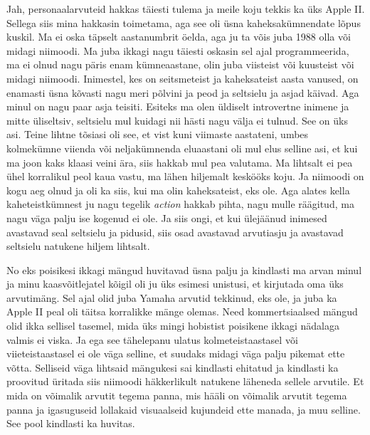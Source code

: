 
Jah, personaalarvuteid hakkas täiesti tulema ja meile koju tekkis ka üks Apple 
II. Sellega siis mina hakkasin toimetama, aga see oli 
üsna  kaheksakümnendate lõpus kuskil. Ma ei oska täpselt aastanumbrit öelda, 
aga ju ta võis juba 1988 olla või midagi niimoodi. Ma juba ikkagi  
nagu täiesti oskasin sel ajal programmeerida, ma ei olnud nagu päris enam kümneaastane, olin juba viisteist või kuusteist või midagi niimoodi. Inimestel, 
kes on seitsmeteist ja kaheksateist aasta vanused, on enamasti üsna 
kõvasti nagu meri põlvini  ja peod ja seltsielu ja asjad käivad. Aga minul on 
nagu paar asja teisiti. Esiteks ma olen üldiselt introvertne inimene ja mitte 
üliseltsiv, seltsielu mul kuidagi nii hästi nagu välja ei tulnud. See on 
üks asi. Teine lihtne tõsiasi oli see, et vist kuni viimaste aastateni, umbes 
kolmekümne viienda või neljakümnenda eluaastani oli mul elus selline asi, et kui ma 
joon kaks klaasi veini ära, siis hakkab mul pea valutama. Ma lihtsalt ei pea 
ühel  korralikul peol kaua vastu, ma lähen hiljemalt 
keskööks koju. Ja niimoodi on  kogu aeg olnud ja oli ka siis, kui ma olin 
kaheksateist, eks ole. Aga alates kella kaheteistkümnest ju nagu tegelik 
\emph{action} hakkab pihta, nagu mulle räägitud, ma nagu väga palju ise kogenud 
ei ole. Ja siis ongi, et kui  ülejäänud inimesed avastavad seal seltsielu 
ja pidusid, siis osad avastavad arvutiasju ja avastavad 
seltsielu natukene hiljem lihtsalt.


No eks poisikesi ikkagi mängud huvitavad üsna palju ja kindlasti ma arvan  
minul ja minu kaasvõitlejatel  kõigil oli ju üks esimesi unistusi, et 
kirjutada oma üks arvutimäng. Sel ajal olid juba  
Yamaha arvutid  tekkinud, eks ole, ja juba ka Apple II peal oli täitsa 
korralikke  mänge olemas. Need kommertsiaalsed mängud olid ikka sellisel 
tasemel, mida üks mingi hobistist poisikene ikkagi nädalaga valmis ei viska. Ja 
ega see tähelepanu ulatus  kolmeteistaastasel või viieteistaastasel ei ole väga 
selline, et suudaks midagi väga palju pikemat ette võtta. Selliseid väga 
lihtsaid mängukesi sai kindlasti ehitatud ja kindlasti ka proovitud üritada 
siis niimoodi häkkerlikult natukene läheneda sellele arvutile. Et mida on 
võimalik arvutit tegema panna, mis hääli on võimalik arvutit tegema panna ja  
igasuguseid lollakaid visuaalseid kujundeid ette manada, ja muu selline. 
See pool kindlasti ka huvitas. 

